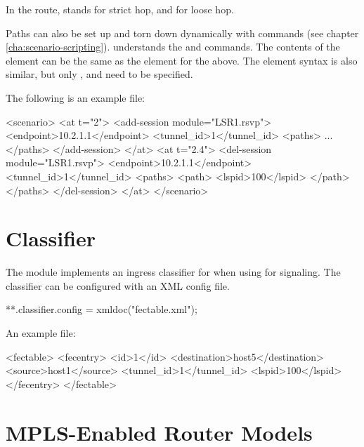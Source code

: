 In the route,  stands for strict hop, and  for loose hop.

Paths can also be set up and torn down dynamically with 
commands (see chapter \ref{cha:scenario-scripting}).
 understands the  and 
 commands. The contents of the 
element can be the same as the  element for the 
above. The  element syntax is also similar, but only
,  and  need to be specified.

The following is an example  file:

\begin{XML}
<scenario>
    <at t="2">
        <add-session module="LSR1.rsvp">
            <endpoint>10.2.1.1</endpoint>
            <tunnel_id>1</tunnel_id>
            <paths>
                ...
            </paths>
        </add-session>
    </at>
    <at t="2.4">
        <del-session module="LSR1.rsvp">
            <endpoint>10.2.1.1</endpoint>
            <tunnel_id>1</tunnel_id>
            <paths>
                <path>
                    <lspid>100</lspid>
                </path>
            </paths>
        </del-session>
    </at>
</scenario>
\end{XML}

\section{Classifier}
\label{sec:mpls:classifier}

The  module implements an ingress classifier for
 when using  for signaling. The classifier can be
configured with an XML config file.

\begin{inifile}
**.classifier.config = xmldoc("fectable.xml");
\end{inifile}

An example  file:

\begin{XML}
<fectable>
    <fecentry>
        <id>1</id>
        <destination>host5</destination>
        <source>host1</source>
        <tunnel_id>1</tunnel_id>
        <lspid>100</lspid>
    </fecentry>
</fectable>
\end{XML}
\section{MPLS-Enabled Router Models}
\label{sec:mpls:mpls-enabled-router-models}

